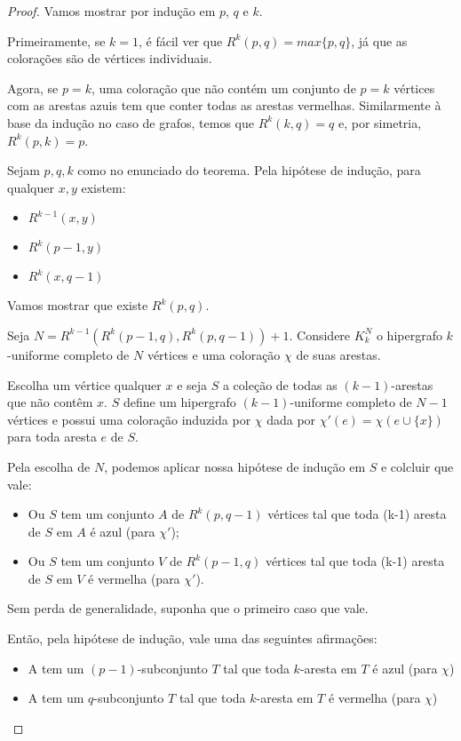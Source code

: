 \begin{proof}
    Vamos mostrar por indução em $p$, $q$ e $k$.

    Primeiramente, se $k=1$, é fácil ver que $R^k(p,q)=max\{p,q\}$, já que as colorações são de vértices individuais.

    Agora, se $p=k$, uma coloração que não contém um conjunto de $p=k$ vértices com as arestas azuis tem que conter todas as arestas vermelhas. Similarmente à base da indução no caso de grafos, temos que $R^k(k,q)=q$ e, por simetria, $R^k(p,k)=p$.

    Sejam $p,q,k$ como no enunciado do teorema. Pela hipótese de indução, para qualquer $x,y$ existem:
    \begin{itemize}
        \item $R^{k-1}(x,y)$
        \item $R^k(p-1,y)$
        \item $R^k(x,q-1)$
    \end{itemize}
    Vamos mostrar que existe $R^k(p,q)$.

    Seja $N=R^{k-1}(R^k(p-1,q),R^k(p,q-1))+1$. Considere $K^N_k$ o hipergrafo $k$-uniforme completo de $N$ vértices e uma coloração $\chi$ de suas arestas.

    Escolha um vértice qualquer $x$ e seja $S$ a coleção de todas as $(k-1)$-arestas que não contêm $x$. $S$ define um hipergrafo $(k-1)$-uniforme completo de $N-1$ vértices e possui uma coloração induzida por $\chi$ dada por $\chi'(e)=\chi(e\cup\{x\})$ para toda aresta $e$ de $S$. 
    
    Pela escolha de $N$, podemos aplicar nossa hipótese de indução em $S$ e colcluir que vale:
    \begin{itemize}
        \item Ou $S$ tem um conjunto $A$ de $R^k(p,q-1)$ vértices tal que toda (k-1) aresta de $S$ em $A$ é azul (para $\chi'$);
        \item Ou $S$ tem um conjunto $V$ de $R^k(p-1,q)$ vértices tal que toda (k-1) aresta de $S$ em $V$ é vermelha (para $\chi'$).
    \end{itemize}
    Sem perda de generalidade, suponha que o primeiro caso que vale.

    Então, pela hipótese de indução, vale uma das seguintes afirmações:
    \begin{itemize}
        \item A tem um $(p-1)$-subconjunto $T$ tal que toda $k$-aresta em $T$ é azul (para $\chi$)
        \item A tem um $q$-subconjunto $T$ tal que toda $k$-aresta em $T$ é vermelha (para $\chi$)
    \end{itemize}
\end{proof}

